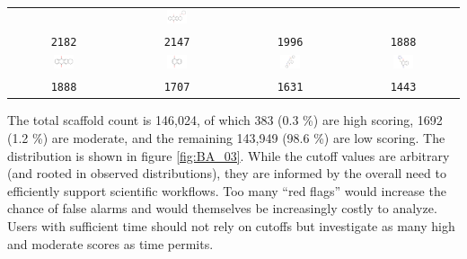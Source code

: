 \begin{table}
\begin{center}
\begin{tabular}{ |c|c|c|c| }
& \includegraphics[align=t,width=0.2\textwidth]{data/badapple/Fig2_scaf_08.png} \\
\texttt{2182} & \texttt{2147} & \texttt{1996} & \texttt{1888} \\
\hline
\includegraphics[align=t,width=0.2\textwidth]{data/badapple/Fig2_scaf_09.png} 
& \includegraphics[align=t,width=0.2\textwidth]{data/badapple/Fig2_scaf_10.png}
& \includegraphics[align=t,width=0.2\textwidth]{data/badapple/Fig2_scaf_11.png}
& \includegraphics[align=t,width=0.2\textwidth]{data/badapple/Fig2_scaf_12.png} \\
\texttt{1888} & \texttt{1707} & \texttt{1631} & \texttt{1443} \\
\hline
\end{tabular}
\end{center}
\label{table:BA_Fig2}
\end{table}

The total scaffold count is 146,024, of which 383 (0.3 \%) are high scoring, 1692 (1.2 \%) are moderate, and the remaining 143,949 (98.6 \%) are low scoring. The distribution is shown in figure \ref{fig:BA_03}. While the cutoff values are arbitrary (and rooted in observed distributions), they are informed by the overall need to efficiently support scientific workflows. Too many “red flags” would increase the chance of false alarms and would themselves be increasingly costly to analyze. Users with sufficient time should not rely on cutoffs but investigate as many high and moderate scores as time permits.

